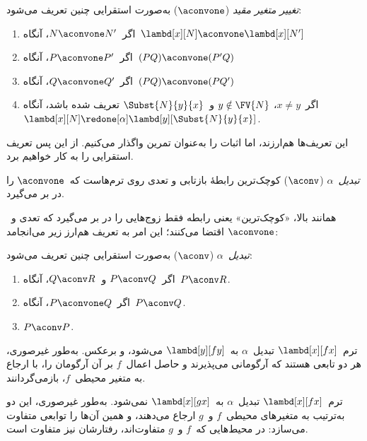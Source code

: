 \documentclass[../../../include/open-logic-section]{subfiles}
\begin{document}
\begin{defn} 
  \emph{تغییر متغیر مقید} ($\aconvone$) به‌صورت استقرایی چنین تعریف
  می‌شود:
  \begin{enumerate}
  \item اگر~$N \aconvone N'$، آنگاه~$\lambd[x][N] \aconvone
    \lambd[x][N']$ 
  \item اگر~$P \aconvone P'$، آنگاه~$(PQ) \aconvone (P'Q)$ 
  \item اگر~$Q \aconvone Q'$، آنگاه~$(PQ) \aconvone (PQ')$ 
  \item اگر~$x \neq y$، $y \notin \FV{N}$ و~$\Subst{N}{y}{x}$ تعریف شده باشد، آنگاه
    $\lambd[x][N] \redone[\alpha] \lambd[y][\Subst{N}{y}{x}]$.
  \end{enumerate}
\end{defn}

این تعریف‌ها هم‌ارزند، اما اثبات را به‌عنوان تمرین واگذار می‌کنیم. از
این پس تعریف استقرایی را به کار خواهیم برد.

\begin{defn}
  \emph{تبدیل~$\alpha$} ($\aconv$) کوچک‌ترین رابطهٔ بازتابی و تعدی
  روی ترم‌هاست که~$\aconvone$ را در بر می‌گیرد.
\end{defn}

همانند بالا، «کوچک‌ترین» یعنی رابطه فقط زوج‌هایی را در بر می‌گیرد که
تعدی و~$\aconvone$ اقتضا می‌کنند؛ این امر به تعریف هم‌ارز زیر می‌انجامد:

\begin{defn} 
  \emph{تبدیل~$\alpha$} ($\aconv$) به‌صورت استقرایی چنین تعریف می‌شود:
  \begin{enumerate}
  \item اگر~$P \aconv Q$ و~$Q \aconv R$، آنگاه~$P \aconv R$.
  \item اگر~$P \aconvone Q$، آنگاه~$P \aconv Q$. 
  \item $P \aconv P$. 
  \end{enumerate}
\end{defn}

\begin{ex}
  ترم~$\lambd[x][f x]$ تبدیل~$\alpha$ به~$\lambd[y][f y]$ می‌شود، و
  برعکس. به‌طور غیرصوری، هر دو تابعی هستند که آرگومانی می‌پذیرند و حاصل
  اعمال~$f$ بر آن آرگومان را، با ارجاع به متغیر محیطی~$f$، بازمی‌گردانند.

  ترم~$\lambd[x][f x]$ تبدیل~$\alpha$ به~$\lambd[x][g x]$ نمی‌شود.
  به‌طور غیرصوری، این دو به‌ترتیب به متغیرهای محیطی~$f$ و~$g$ ارجاع
  می‌دهند، و همین آن‌ها را توابعی متفاوت می‌سازد: در محیط‌هایی که~$f$
  و~$g$ متفاوت‌اند، رفتارشان نیز متفاوت است.
\end{ex}
\end{document}
